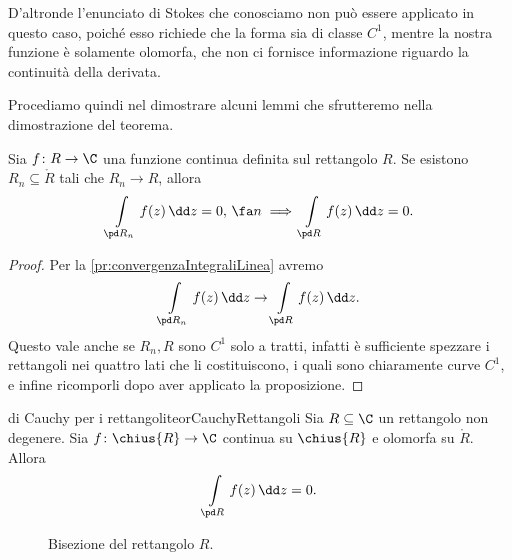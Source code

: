 D'altronde l'enunciato di Stokes che conosciamo non può essere applicato in questo caso, poiché esso richiede che la forma sia di classe \(C^1\), mentre la nostra funzione è solamente olomorfa, che non ci fornisce informazione riguardo la continuità della derivata.

Procediamo quindi nel dimostrare alcuni lemmi che sfrutteremo nella dimostrazione del teorema.

\begin{lem}
	Sia \(f\colon R \to \C\) una funzione continua definita sul rettangolo \(R\).
	Se esistono \(R_n \subseteq \mathring{R}\) tali che \(R_n \to R\), allora
	\[
		\int\limits_{\pd R_n}f(z)\,\dd z = 0,\,\fa n \implies \int\limits_{\pd R}f(z)\,\dd z = 0.
	\]
\end{lem}

\begin{proof}
	Per la \autoref{pr:convergenzaIntegraliLinea} avremo
	\[
		\int\limits_{\pd R_n}f(z)\,\dd z \to \int\limits_{\pd R}f(z)\,\dd z.
	\]
	Questo vale anche se \(R_n,R\) sono \(C^1\) solo a tratti, infatti è sufficiente spezzare i rettangoli nei quattro lati che li costituiscono, i quali sono chiaramente curve \(C^1\), e infine ricomporli dopo aver applicato la proposizione.
\end{proof}

\begin{teor}{di Cauchy per i rettangoli}{teorCauchyRettangoli}
	Sia \(R\subseteq \C\) un rettangolo non degenere.
	Sia \(f\colon \chius{R}\to\C\) continua su \(\chius{R}\) e olomorfa su \(\mathring{R}\).
	Allora
	\[
		\int\limits_{\pd R}f(z)\,\dd z = 0.
	\]
\end{teor}

\begin{figure}[tp]
	\centering
	
	\caption{Bisezione del rettangolo \(R\).}
	\label{fig:teorCauchyRettangolo}
\end{figure}

